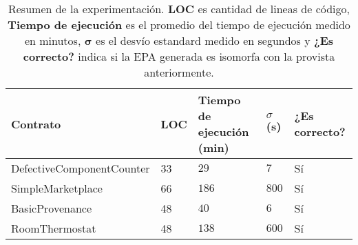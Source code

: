 \vspace{-2.2em}

\begin{table}
    \caption{Resumen de la experimentación. \textbf{LOC} es cantidad de lineas de código, \textbf{Tiempo de ejecución} es el promedio del tiempo de ejecución medido en minutos, $\boldsymbol{\sigma}$ es el desvío estandard medido en segundos y \textbf{¿Es correcto?} indica si la EPA generada es isomorfa con la provista anteriormente.}\label{tab:resultados}
    \begin{tabular}{|l|l|l|l|l|}
        \hline
        Contrato                  & LOC & Tiempo de ejecución (min) & $\sigma$ (s) & ¿Es correcto? \\
        \hline
        DefectiveComponentCounter & 33  & $29$                      & $7$          & Sí            \\
        SimpleMarketplace         & 66  & $186$                     & $800$        & Sí            \\
        BasicProvenance           & 48  & $40$                      & $6$          & Sí            \\
        RoomThermostat            & 48  & $138$                     & $600$        & Sí            \\
        \hline
    \end{tabular}
\end{table}
